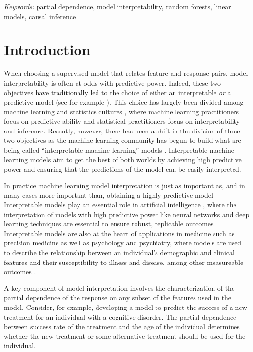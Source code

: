 \documentclass[12pt]{article}
\begin{document}
\noindent%
{\it Keywords:} partial dependence, model interpretability, random forests, linear models, causal inference

\section{Introduction}
\label{sec:intro}

When choosing a supervised model that relates feature and response pairs, model interpretability is often at odds with predictive power. Indeed, these two objectives have traditionally led to the choice of either an interpretable \emph{or} a predictive model (see for example \cite{shmueli2010explain}). This choice has largely been divided among machine learning and statistics cultures \citep{breiman2001statistical, donoho201750}, where machine learning practitioners focus on predictive ability and statistical practitioners focus on interpretability and inference. Recently, however, there has been a shift in the division of these two objectives as the machine learning community has begun to build what are being called  ``interpretable machine learning'' models \citep{doshi2017towards, vellido2012making}. Interpretable machine learning models aim to get the best of both worlds by achieving high predictive power and ensuring that the predictions of the model can be easily interpreted. 

In practice machine learning model interpretation is just as important as, and in many cases more important than, obtaining a highly predictive model. Interpretable models play an essential role in artificial intelligence \citep{adadi2018peeking}, where the interpretation of models with high predictive power like neural networks and deep learning techniques are essential to ensure robust, replicable outcomes. Interpretable models are also at the heart of applications in medicine such as precision medicine as well as psychology and psychiatry, where models are used to describe the relationship between an individual's demographic and clinical features and their susceptibility to illness and disease, among other measureable outcomes \citep{dwyer2018machine, katuwal2016machine}.

A key component of model interpretation involves the characterization of the partial dependence of the response on any subset of the features used in the model. Consider, for example, developing a model to predict the success of a new treatment for an individual with a cognitive disorder. The partial dependence between success rate of the treatment and the age of the individual determines whether the new treatment or some alternative treatment should be used for the individual. 
\end{document}
